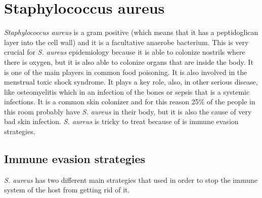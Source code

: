 \chapter{Staphylococcus aureus}

\emph{Staphylococcus aureus} is a gram positive (which means that it has a peptidoglican layer into the cell wall) and it is a facultative anaerobe bacterium. This is very crucial for \emph{S. aureus} epidemiology because it is able to colonize nostrils where there is oxygen, but it is also able to colonize organs that are inside the body. It is  one of the main players in common food poisoning. It is also involved in the menstrual toxic shock syndrome. It plays a key role, also, in other serious disease, like osteomyelitis which in an infection of the bones or sepsis that is a systemic infections. 
It is a common skin colonizer and for this reason 25$\%$ of the people in this room probably have \emph{S. aureus} in their body, but it is also the cause of very bad skin infection. 
\emph{S. aureus} is tricky to treat because of is immune evasion strategies.

\section{Immune evasion strategies}

\emph{S. aureus} has two different main strategies that used in order to stop the immune system of the host from getting rid of it. 

